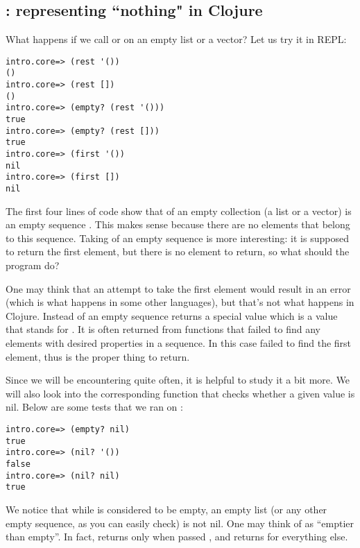 \subsection{: representing ``nothing" in Clojure}\label{subsec:nil}
What happens if we call  or  on an empty list or a vector?  Let us try it in REPL:
\begin{framed}
\begin{verbatim}
intro.core=> (rest '())
()
intro.core=> (rest [])
()
intro.core=> (empty? (rest '()))
true
intro.core=> (empty? (rest []))
true
intro.core=> (first '())
nil
intro.core=> (first [])
nil
\end{verbatim}
\end{framed}
The first four lines of code show that  of an empty collection (a list or a vector) is an empty sequence \clocode{()}. This makes sense because there are no elements that belong to this sequence. Taking  of an empty sequence is more interesting: it is supposed to return the first element, but there is no element to return, so what should the program do? 

One may think that an attempt to take the first element would result in an error (which is what happens in some other languages), but that's not what happens in Clojure. Instead  of an empty sequence returns a special value  which is a value that stands for . It is often returned from functions that failed to find any elements with desired properties in a sequence. In this case  failed to find the first element, thus  is the proper thing to return. 

Since we will be encountering  quite often, it is helpful to study it a bit more. We will also look into the corresponding function  that checks whether a given value is nil. Below are some tests that we ran on  :
\begin{framed}
\begin{verbatim}
intro.core=> (empty? nil)
true
intro.core=> (nil? '())
false
intro.core=> (nil? nil)
true
\end{verbatim}
\end{framed}
We notice that while  is considered to be empty, an empty list (or any other empty sequence, as you can easily check) is not nil. One may think of   as ``emptier than empty''. In fact,  returns  only when passed , and returns  for everything else. 

